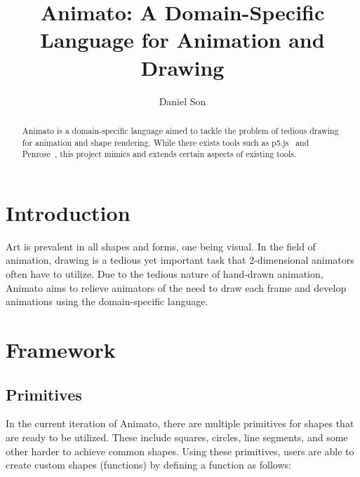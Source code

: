 \documentclass[acmsmall,screen]{acmart}
\begin{document}
\title{Animato: A Domain-Specific Language for Animation and Drawing}

\author{Daniel Son}

\renewcommand{\shortauthors}{Daniel Son}

\renewcommand\footnotetextcopyrightpermission[1]{}
\pagestyle{fancy}
\fancyfoot{}
\makeatletter
\let\@authorsaddresses\@empty
\makeatother

\begin{abstract}
    Animato is a domain-specific language aimed to tackle the problem of tedious drawing for animation and shape rendering.
    While there exists tools such as p5.js~\cite{p5js} and Penrose~\cite{penrose}, this project mimics and extends certain aspects of existing tools.

\end{abstract}


\maketitle
\thispagestyle{firstfancy}

\section{Introduction}
Art is prevalent in all shapes and forms, one being visual.
In the field of animation, drawing is a tedious yet important task that 2-dimensional animators often have to utilize.
Due to the tedious nature of hand-drawn animation, Animato aims to relieve animators of the need to draw each frame and develop animations using the domain-specific language.

\section{Framework}
\subsection{Primitives}
In the current iteration of Animato, there are multiple primitives for shapes that are ready to be utilized.
These include squares, circles, line segments, and some other harder to achieve common shapes. 
Using these primitives, users are able to create custom shapes (functions) by defining a function as follows:
\end{document}
